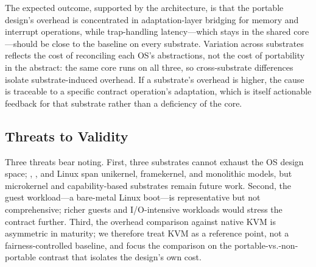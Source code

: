 The expected outcome, supported by the architecture, is that the portable
design's overhead is concentrated in adaptation-layer bridging for memory and
interrupt operations, while trap-handling latency---which stays in the shared
core---should be close to the baseline on every substrate. Variation across
substrates reflects the cost of reconciling each OS's abstractions, not the cost
of portability in the abstract: the same core runs on all three, so
cross-substrate differences isolate substrate-induced overhead. If a substrate's
overhead is higher, the cause is traceable to a specific contract operation's
adaptation, which is itself actionable feedback for that substrate rather than a
deficiency of the core.

\subsection{Threats to Validity}

Three threats bear noting. First, three substrates cannot exhaust the OS design
space; \arceos{}, \asterinas{}, and Linux span unikernel, framekernel, and
monolithic models, but microkernel and capability-based substrates remain future
work. Second, the guest workload---a bare-metal Linux boot---is representative
but not comprehensive; richer guests and I/O-intensive workloads would stress
the contract further. Third, the overhead comparison against native KVM is
asymmetric in maturity; we therefore treat KVM as a reference point, not a
fairness-controlled baseline, and focus the comparison on the
portable-vs.-non-portable \axvisor{} contrast that isolates the design's own
cost.
